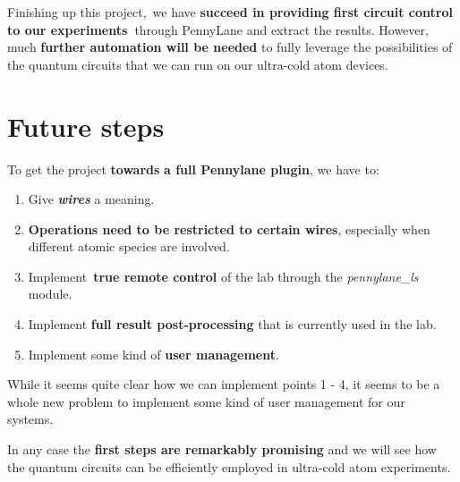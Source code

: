 \documentclass[%
 reprint,
 amsmath,amssymb,
 aps,
]{revtex4-1}
\providecommand{\tightlist}{\setlength{\itemsep}{0pt}\setlength{\parskip}{0pt}}%
\begin{document}
\par\null

Finishing up this project,~we have \textbf{succeed in providing first
circuit control to our experiments~}through PennyLane and extract the
results. However, much \textbf{further automation will be needed} to
fully leverage the possibilities of the quantum circuits that we can run
on our ultra-cold atom devices.

\section*{Future steps}\label{future-steps}

To get the project \textbf{towards} \textbf{a full Pennylane plugin}, we
have to:

\begin{enumerate}
\tightlist
\item
  Give \emph{\textbf{wires}} \textbf{} a \textbf{} meaning.
\item
  \textbf{Operations need to be restricted to certain wires}, especially
  when different atomic species are involved.
\item
  Implement~\textbf{true remote control} of the lab through the
  \emph{pennylane\_ls} module.
\item
  Implement \textbf{full result post-processing} that is currently used
  in the lab.
\item
  Implement some kind of \textbf{user management}.
\end{enumerate}

While it seems quite clear how we can implement points 1 - 4, it seems
to be a whole new problem to implement some kind of user management for
our systems.~

In any case the \textbf{first steps are remarkably promising} and we
will see how the quantum circuits can be efficiently employed in
ultra-cold atom experiments.

\FloatBarrier
\nocite{*}



\end{document}

